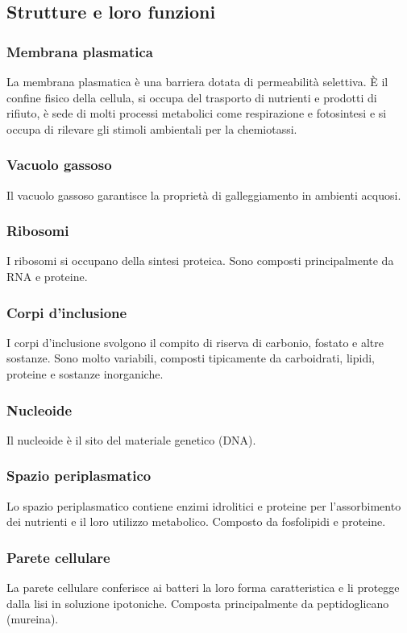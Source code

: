 \subsection{Strutture e loro funzioni}
\subsubsection{Membrana plasmatica}
La membrana plasmatica \`e una barriera dotata di permeabilit\`a selettiva. \`E il confine fisico della cellula, si occupa del trasporto di nutrienti e 
prodotti di rifiuto, \`e sede di molti processi metabolici come respirazione e fotosintesi e si occupa di rilevare gli stimoli ambientali per la 
chemiotassi.
\subsubsection{Vacuolo gassoso}
Il vacuolo gassoso garantisce la propriet\`a di galleggiamento in ambienti acquosi.
\subsubsection{Ribosomi}
I ribosomi si occupano della sintesi proteica. Sono composti principalmente da RNA e proteine.
\subsubsection{Corpi d'inclusione}
I corpi d'inclusione svolgono il compito di riserva di carbonio, fostato e altre sostanze. Sono molto variabili, composti tipicamente da carboidrati, 
lipidi, proteine e sostanze inorganiche.
\subsubsection{Nucleoide}
Il nucleoide \`e il sito del materiale genetico (DNA).
\subsubsection{Spazio periplasmatico}
Lo spazio periplasmatico contiene enzimi idrolitici e proteine per l'assorbimento dei nutrienti e il loro utilizzo metabolico. Composto da fosfolipidi e 
proteine. 
\subsubsection{Parete cellulare}
La parete cellulare conferisce ai batteri la loro forma caratteristica e li protegge dalla lisi in soluzione ipotoniche. Composta principalmente da 
peptidoglicano (mureina).
